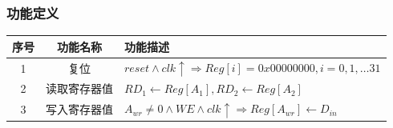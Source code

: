 \documentclass[main.tex]{subfiles}
\begin{document}
\subsubsection{功能定义}
\begin{center}
    \begin{tabular}{c c l}
        \toprule
        序号 & 功能名称 & 功能描述 \\
        \midrule
        1 & 复位 & $reset \land clk\uparrow \Rightarrow  Reg[i] = 0x00000000, i=0, 1, \dots 31 $ \\
        2 & 读取寄存器值 & $ RD_1 \leftarrow Reg[A_1], RD_2 \leftarrow Reg[A_2] $ \\
        3 & 写入寄存器值 & $A_{wr} \neq 0 \land WE \land clk\uparrow \Rightarrow Reg[A_{wr}] \leftarrow D_{in}$ \\
        \bottomrule
    \end{tabular}
\end{center}
\end{document}
